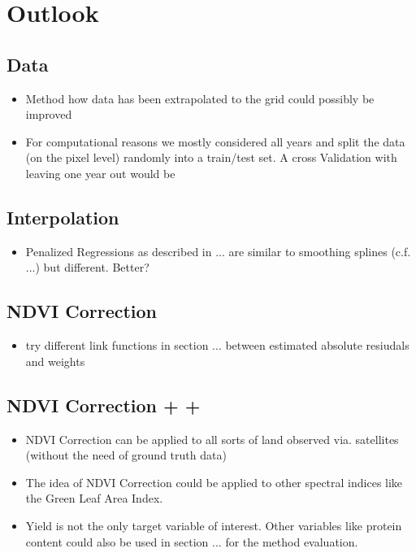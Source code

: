 \chapter{Outlook}

\section{Data}
\begin{itemize}
    \item Method how data has been extrapolated to the grid could possibly be improved
    \item For computational reasons we mostly considered all years and split the data (on the pixel level) randomly into a train/test set. A cross Validation with leaving one year out would be 
\end{itemize}    

\section{Interpolation}
\begin{itemize}
    \item Penalized Regressions as described in ... are similar to smoothing splines (c.f. ...) but different. Better?
\end{itemize}    

\section{NDVI Correction}
\begin{itemize}
    \item try different link functions in section ... between estimated absolute resiudals and weights
\end{itemize}    


\section{NDVI Correction + +}
\begin{itemize}
    \item NDVI Correction can be applied to all sorts of land observed via. satellites (without the need of ground truth data)
    \item The idea of NDVI Correction could be applied to other spectral indices like the Green Leaf Area Index.
    \item Yield is not the only target variable of interest. Other variables like protein content could also be used in section ... for the method evaluation. 
\end{itemize}    

